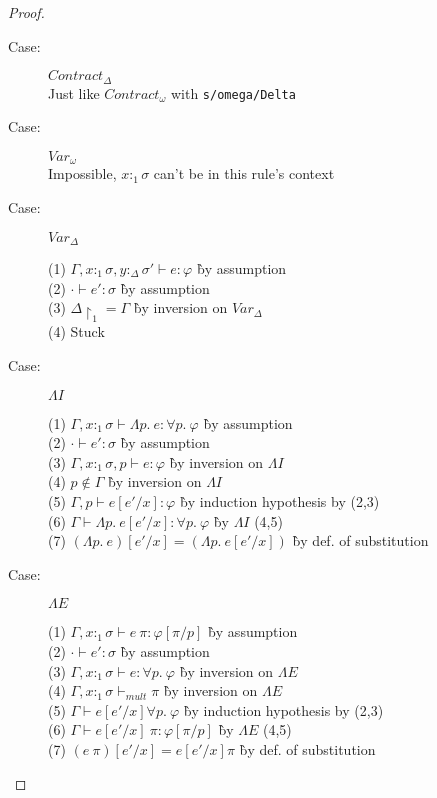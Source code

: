 \begin{proof}
\begin{description}
\item[Case:] $Contract_\Delta$\\
Just like $Contract_\omega$ with \texttt{s/omega/Delta}

\item[Case:] $Var_\omega$\\
  Impossible, $x{:}_1\sigma$ can't be in this rule's context

\item[Case:] $Var_\Delta$
\begin{tabbing}
  (1) $\Gamma, x{:}_1\sigma, y{:}_\Delta\sigma' \vdash e : \varphi$ \` by assumption\\
  (2) $\cdot \vdash e' : \sigma$ \` by assumption\\
  (3) $\Delta\!\upharpoonright_1 = \Gamma$ \` by inversion on $Var_\Delta$\\
  (4) Stuck
\end{tabbing}

\item[Case:] $\Lambda I$
\begin{tabbing}
  (1) $\Gamma, x{:}_1\sigma \vdash \Lambda p.~e : \forall p.~\varphi$ \` by assumption\\
  (2) $\cdot \vdash e' : \sigma$ \` by assumption\\
  (3) $\Gamma, x{:}_1\sigma, p \vdash e : \varphi$ \` by inversion on $\Lambda I$\\
  (4) $p \notin \Gamma$ \` by inversion on $\Lambda I$\\
  (5) $\Gamma, p \vdash e[e'/x] : \varphi$ \` by induction hypothesis by (2,3)\\
  (6) $\Gamma \vdash \Lambda p.~e[e'/x] : \forall p.~\varphi$ \` by $\Lambda I$ (4,5)\\
  (7) $(\Lambda p.~e)[e'/x] = (\Lambda p.~e[e'/x])$ \` by def. of substitution\\
\end{tabbing}

\item[Case:] $\Lambda E$
\begin{tabbing}
  (1) $\Gamma, x{:}_1\sigma \vdash e~\pi: \varphi[\pi/p]$ \` by assumption\\
  (2) $\cdot \vdash e' : \sigma$ \` by assumption\\
  (3) $\Gamma, x{:}_1\sigma \vdash e : \forall p.~\varphi$ \` by inversion on $\Lambda E$\\
  (4) $\Gamma, x{:}_1\sigma \vdash_{mult} \pi$ \` by inversion on $\Lambda E$\\
  (5) $\Gamma \vdash e[e'/x] \forall p.~\varphi$ \` by induction hypothesis by (2,3)\\
  (6) $\Gamma \vdash e[e'/x]~\pi : \varphi[\pi/p]$ \` by $\Lambda E$ (4,5)\\
  (7) $(e~\pi)[e'/x] = e[e'/x] \pi$ \` by def. of substitution\\
\end{tabbing}


\end{description}
\end{proof}
